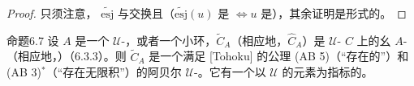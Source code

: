 \begin{proof}只须注意， $\widetilde{\mathrm{esj}}$ 与交换且（$\widetilde{\mathrm{esj}}(u)$ 是 $\Leftrightarrow u$ 是），其余证明是形式的。\end{proof}
\begin{SGAresult}{命题}{6.7}
设 $A$ 是一个 $\mathcal U$-，或者一个小环，$\widetilde C_A$（相应地，$\widehat C_A$）是 $\mathcal U$- $C$ 上的幺 $A$-（相应地，）（6.3.3）。则 $\widetilde C_A$ 是一个满足 [Tohoku] 的公理 (AB 5)（“存在的”）和 (AB 3)$^*$（“存在无限积”）的阿贝尔 $\mathcal U$-。它有一个以 $\mathcal U$ 的元素为指标的。
\end{SGAresult}
